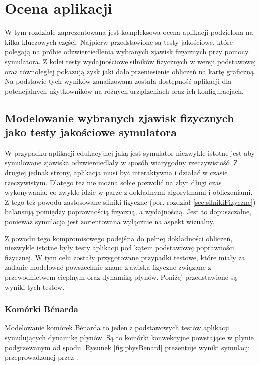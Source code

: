 \chapter{Ocena aplikacji}
\label{cha:ocena}

W tym rozdziale zaprezentowana jest kompleksowa ocena aplikacji \en podzielona
na kilka kluczowych części. Najpierw przedstawione są testy jakościowe, które
polegają na próbie odzwierciedlenia wybranych zjawisk fizycznych przy pomocy
symulatora. Z kolei testy wydajnościowe silników fizycznych w wersji
podstawowej oraz równoległej pokazują zysk jaki dało przeniesienie obliczeń na
kartę graficzną. Na podstawie tych wyników zanalizowana została dostępność
aplikacji dla potencjalnych użytkowników na różnych urządzeniach oraz ich
konfiguracjach.

\section{Modelowanie wybranych zjawisk fizycznych jako testy jakościowe symulatora}

W przypadku aplikacji edukacyjnej jaką jest symulator \en niezwykle istotne
jest aby symulowane zjawiska odzwierciedlały w sposób  wiarygodny
rzeczywistość. Z drugiej jednak strony, aplikacja musi być interaktywna i
działać w czasie rzeczywistym. Dlatego też nie można sobie pozwolić na zbyt
długi czas wykonywania, co zwykle idzie w parze z dokładnymi algorytmami i
obliczeniami. Z tego też powodu zastosowane silniki fizyczne (por. rozdział
\ref{sec:silnikiFizyczne}) balansują pomiędzy poprawnością fizyczną, a
wydajnością. Jest to dopuszczalne, ponieważ symulacja jest zorientowana
wyłącznie na aspekt wizualny.

Z powodu tego kompromisowego podejścia do pełnej dokładności obliczeń, niezwykle
istotne były testy aplikacji pod kątem podstawowej poprawności fizycznej. W tym
celu zostały przygotowane przypadki testowe, które miały za zadanie modelować
powszechnie znane zjawiska fizyczne związane z przewodnictwem cieplnym oraz
dynamiką płynów. Poniżej przedstawione są wyniki tych testów.

\subsection{Komórki Bénarda}

Modelowanie komórek Bénarda to jeden z podstawowych testów aplikacji
symulujących dynamikę płynów. Są to komórki konwekcyjne powstające w płynie
podgrzewanym od spodu. Rysunek \ref{fig:physBenard} prezentuje wyniki symulacji
przeprowadzonej przez \en.


